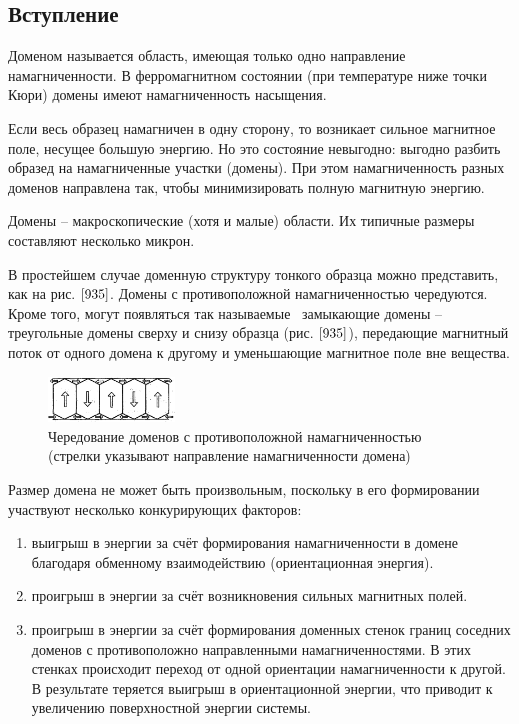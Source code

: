 \documentclass[a4paper,14pt]{article} %
\begin{document}
\subsection{Вступление}

Доменом называется область, имеющая только одно направление намагниченности. В ферромагнитном состоянии (при температуре ниже точки Кюри) домены имеют намагниченность насыщения.

Если весь образец намагничен в одну сторону, то возникает сильное магнитное поле, несущее большую энергию. Но это состояние невыгодно: выгодно разбить образед на намагниченные участки (домены). При этом намагниченность разных доменов направлена так, чтобы минимизировать полную магнитную энергию.

$\textbf{Домены}$ -- макроскопические (хотя и малые) области. Их типичные размеры составляют несколько микрон.

В простейшем случае доменную структуру тонкого образца можно представить, как на рис. $\ref{935}$. Домены с противоположной намагниченностью чередуются. Кроме того, могут появляться так называемые \
$\textbf{замыкающие}$ $\textbf{домены}$ -- треугольные домены сверху и снизу образца (рис. $\ref{935}$), передающие магнитный поток от одного домена к другому и уменьшающие магнитное поле вне вещества.

\begin{figure}[h!]

\begin{center}
\includegraphics[width=0.3\textwidth]{9.3.5.png} 
\end{center}
\caption{Чередование доменов с противоположной намагниченностью (стрелки указывают направление намагниченности домена)}
\label{935}

\end{figure}

\newpage

Размер домена не может быть произвольным, поскольку в его формировании участвуют несколько конкурирующих факторов:
\begin{enumerate}
    \item выигрыш в энергии за счёт формирования намагниченности в домене благодаря обменному взаимодействию ($\textbf{ориентационная энергия}$).
    \item проигрыш в энергии за счёт возникновения сильных магнитных полей.
    \item проигрыш в энергии за счёт формирования доменных стенок границ соседних доменов с противоположно направленными намагниченностями. В этих стенках происходит переход от одной ориентации намагниченности к другой. В результате теряется выигрыш в ориентационной энергии, что приводит к увеличению поверхностной энергии системы.
\end{enumerate}
\end{document}
